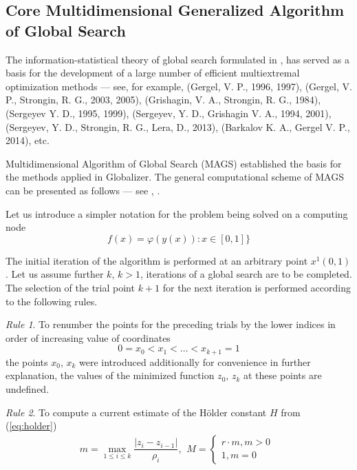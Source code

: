 \documentclass{gOMS2e}
\theoremstyle{plain}%
\theoremstyle{definition}
\theoremstyle{remark}
\begin{document}
\subsection{Core Multidimensional Generalized Algorithm of Global Search}
\label{subsec:corepar}
The information-statistical theory of global search formulated in \cite{strongin1978}, \cite{strSergGO}
has served as a basis for the development of a large number of efficient multiextremal
optimization methods --- see, for example, (Gergel, V. P., 1996, 1997), (Gergel, V. P., Strongin, R. G., 2003, 2005), (Grishagin, V. A., Strongin, R. G., 1984), (Sergeyev Y. D., 1995, 1999), (Sergeyev, Y. D., Grishagin V. A., 1994, 2001), (Sergeyev, Y. D., Strongin, R. G., Lera, D., 2013), (Barkalov K. A., Gergel V. P., 2014), etc.
\par
Multidimensional Algorithm of Global Search (MAGS) established the basis for the
methods applied in Globalizer. The general computational scheme of MAGS can be
presented as follows --- see \cite{strongin1978}, \cite{strSergGO}.
\par
Let us introduce a simpler notation for the problem being solved on a computing node
\begin{equation}
\label{eq:oneDimFunc}
f(x) = \varphi(y(x)):x\in [0,1]\}
\end{equation}
\par
The initial iteration of the algorithm is performed at an arbitrary point \(x^1(0,1)\).
Let us assume further \(k\), \(k>1\), iterations of a global search are to be completed.
The selection of the trial point \(k+1\) for the next iteration is performed according to the following rules.
\par
\textit{Rule 1}. To renumber the points for the preceding trials by the lower indices in order of increasing value of coordinates
\begin{equation}
  \label{step1}
0=x_0<x_1<\dotsc<x_{k+1}=1
\end{equation}
the points \(x_0\), \(x_k\) were introduced additionally for convenience in further explanation,
the values of the minimized function \(z_0\), \(z_k\) at these points are undefined.
\par
\textit{Rule 2}. To compute a current estimate of the Hölder constant \(H\) from (\ref{eq:holder})
\begin{equation}
  \label{step2}
m=\max_{1\leqslant i\leqslant k}\dfrac{|z_i-z_{i-1}|}{\rho_i},
\begin{matrix}
    M =
    \left\{
    \begin{matrix}
    r\cdot m,m>0 \\
    1,m=0
    \end{matrix} \right.
    \end{matrix}
\end{equation}
\end{document}
